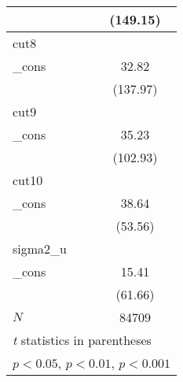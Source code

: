 {\begin{tabular}{l*{1}{c}}
            &    (149.15)         \\
\hline
cut8        &                     \\
\_cons      &       32.82\sym{***}\\
            &    (137.97)         \\
\hline
cut9        &                     \\
\_cons      &       35.23\sym{***}\\
            &    (102.93)         \\
\hline
cut10       &                     \\
\_cons      &       38.64\sym{***}\\
            &     (53.56)         \\
\hline
sigma2\_u    &                     \\
\_cons      &       15.41\sym{***}\\
            &     (61.66)         \\
\hline
\(N\)       &       84709         \\
\hline\hline
\multicolumn{2}{l}{\footnotesize \textit{t} statistics in parentheses}\\
\multicolumn{2}{l}{\footnotesize \sym{*} \(p<0.05\), \sym{**} \(p<0.01\), \sym{***} \(p<0.001\)}\\
\end{tabular}
}
